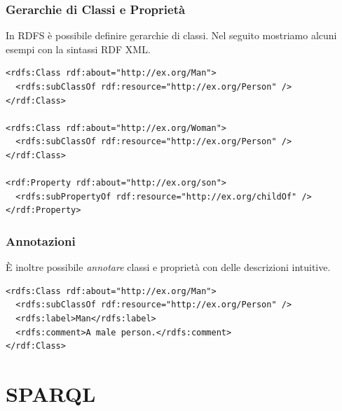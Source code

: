 \documentclass[8pt]{beamer}
\begin{document}
\begin{frame}[fragile]
 \frametitle{Gerarchie di Classi e Propriet\`a}
 In RDFS \`e possibile definire gerarchie di classi. Nel seguito mostriamo alcuni esempi
 con la sintassi RDF XML.

\begin{Verbatim}[fontsize=\small]
<rdfs:Class rdf:about="http://ex.org/Man">
  <rdfs:subClassOf rdf:resource="http://ex.org/Person" />
</rdf:Class>

<rdfs:Class rdf:about="http://ex.org/Woman">
  <rdfs:subClassOf rdf:resource="http://ex.org/Person" />
</rdf:Class>

<rdf:Property rdf:about="http://ex.org/son">
  <rdfs:subPropertyOf rdf:resource="http://ex.org/childOf" />
</rdf:Property>
\end{Verbatim} 
\end{frame}

\begin{frame}[fragile]
 \frametitle{Annotazioni}
 \`E inoltre possibile \emph{annotare} classi e propriet\`a con 
 delle descrizioni intuitive.
 \vspace{\baselineskip}
 
\begin{Verbatim}[fontsize=\small]
<rdfs:Class rdf:about="http://ex.org/Man">
  <rdfs:subClassOf rdf:resource="http://ex.org/Person" />
  <rdfs:label>Man</rdfs:label>
  <rdfs:comment>A male person.</rdfs:comment>
</rdf:Class>
\end{Verbatim} 
\end{frame}

\section{SPARQL}
\end{document}
